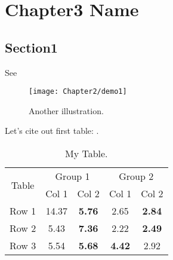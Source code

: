 
\chapter{Chapter3 Name} %
\label{ch:doptim_netsys} %




\section{Section1}\label{sec:top_opt_model}

 
See 

\begin{figure}[!htbp]
  \centering
    \texttt{[image: Chapter2/demo1]}
  \caption{Another illustration.}
  \label{fig:demo2}
\end{figure}

Let's cite out first table: .

\begin{table}
	\centering
	\begin{tabular}{ccccc}\toprule
		\multirow{2}{*}{Table}  & \multicolumn{2}{c}{Group 1}   & \multicolumn{2}{c}{Group 2}\\
		& Col 1   &  Col 2 & Col 1   &  Col 2 \\\midrule
		Row 1 & 14.37 & \textbf{5.76} & 2.65 & \textbf{2.84}\\
		Row 2   & 5.43 & \textbf{7.36}     & 2.22 & \textbf{2.49}\\ 
		Row 3 & 5.54 & \textbf{5.68}   & \textbf{4.42} &  2.92\\
		\bottomrule
	\end{tabular}
	\caption{My Table.}
	\label{tab:mytable}
\end{table}

